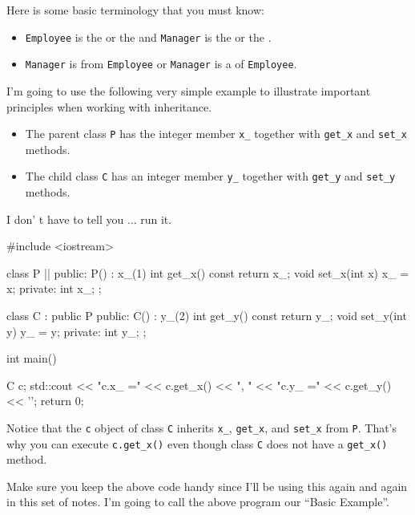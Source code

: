 Here is some basic terminology that you must know:

\begin{itemize}
\item
  \texttt{Employee} is the  or the
   and \texttt{Manager} is the  or
  the .
\item
  \texttt{Manager} is  from \texttt{Employee} or
  \texttt{Manager} is a  of \texttt{Employee}.
\end{itemize}

I'm going to use the following very simple example to illustrate
important principles when working with inheritance.

\begin{itemize}
\item
  The parent class \texttt{P} has the integer member \verb!x_! together
  with \verb!get_x! and \verb!set_x! methods.
\item
  The child class \texttt{C} has an integer member \verb!y_! together
  with \verb!get_y! and \verb!set_y! methods.
\end{itemize}

I don' t have to tell you ... run it.

\begin{consolethree}[escapeinside=||]
#include <iostream>

class P
{
||
public:
        P() : x_(1) {}
        int get_x() const { return x_; }
        void set_x(int x) { x_ = x; }
private:
        int x_;
};

class C : public P
{
public:
        C() : y_(2) {}
        int get_y() const { return y_; }
        void set_y(int y) { y_ = y; }
private:
        int y_;
};

int main()
{   
    C c;
    std::cout << "c.x_ =" << c.get_x() << ", "
              << "c.y_ =" << c.get_y() << '\n';
return 0;

} 
\end{consolethree}

Notice that the \texttt{c} object of class \texttt{C} inherits \verb!x_!,
\verb!get_x!, and \verb!set_x! from \texttt{P}. That's why you can
execute \verb!c.get_x()! even though class \texttt{C} does not have a
\verb!get_x()! method.

Make sure you keep the above code handy since I'll be using this again
and again in this set of notes. I'm going to call the above program our
``Basic Example''.

